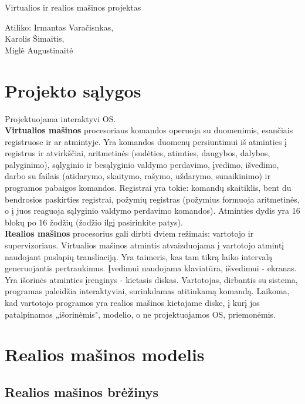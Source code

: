 \documentclass[12pt]{article}
\begin{document}
	\begin{titlepage}
		\begin{center}
		\Huge Virtualios ir realios mašinos projektas\\
		[4cm]
		\end{center}
		\begin{flushright}
		Atiliko:
		Irmantas Varačisnkas,\\
		Karolis Šimaitis,\\
		Miglė Augustinaitė\\
		\end{flushright}
	
	\end{titlepage}
	\tableofcontents
	\clearpage
	\section{Projekto sąlygos}
	Projektuojama interaktyvi OS.\\
	\textbf{Virtualios mašinos} procesoriaus komandos operuoja su duomenimis, esančiais registruose ir ar 		atmintyje. Yra komandos duomenų persiuntimui iš atminties į registrus ir atvirkščiai, aritmetinės (sudėties, atimties, daugybos, dalybos, palyginimo), sąlyginio ir besąlyginio valdymo perdavimo, įvedimo, išvedimo, darbo su failais (atidarymo, skaitymo, rašymo, uždarymo, sunaikinimo) ir programos pabaigos komandos. Registrai yra tokie: komandų skaitiklis, bent du bendrosios paskirties registrai, požymių registras (požymius formuoja aritmetinės, o į juos reaguoja sąlyginio valdymo perdavimo komandos). Atminties dydis yra 16 blokų po 16 žodžių (žodžio ilgį pasirinkite patys).\\
	\textbf{Realios mašinos} procesorius gali dirbti dviem režimais: vartotojo ir supervizoriaus. Virtualios mašinos atmintis atvaizduojama į vartotojo atmintį naudojant puslapių transliaciją. Yra taimeris, kas tam tikrą laiko intervalą generuojantis pertraukimus. Įvedimui naudojama klaviatūra, išvedimui - ekranas. Yra išorinės atminties įrenginys - kietasis diskas.
Vartotojas, dirbantis su sistema, programas paleidžia interaktyviai, surinkdamas atitinkamą komandą. Laikoma, kad vartotojo programos yra realios mašinos kietajame diske, į kurį jos patalpinamos „išorinėmis", modelio, o ne projektuojamos OS, priemonėmis.
	\clearpage
	\section{Realios mašinos modelis}
	\subsection{Realios mašinos brėžinys}
	
\end{document}
